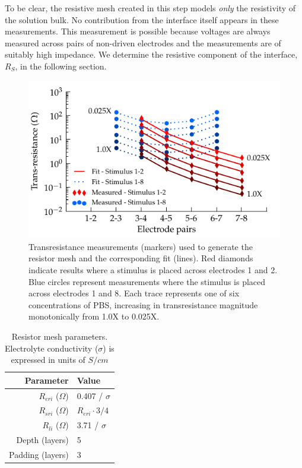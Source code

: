 \documentclass[journal, a4paper]{IEEEtran}
\begin{document}
{
    \color{blue}
    To be clear, the resistive mesh created in this step models \textit{only} the resistivity of the solution bulk. No contribution from the interface itself appears in these measurements. {\color{blue} This measurement is possible} because voltages are always measured across pairs of non-driven electrodes and the measurements are of suitably high impedance. We determine the resistive component of the interface, $R_{S}$, in the {\color{blue} following} section.
}

\begin{figure}
    \begin{center}
        \includegraphics{graphics/pbs_transimpedance_IEEE}
    \end{center}
    \caption{Transresistance measurements (markers) used to generate the resistor mesh and the corresponding fit (lines). Red diamonds indicate results where a stimulus is placed across electrodes 1 and 2. Blue circles represent measurements where the stimulus is placed across electrodes 1 and 8. Each trace represents one of six concentrations of PBS, increasing in transresistance magnitude monotonically from 1.0X to 0.025X.}
    \label{fig:transresistance}
\end{figure}


\begin{table}
    \caption{Resistor mesh parameters. Electrolyte conductivity ($\sigma$) is expressed in units of $S / cm$}
    \label{tab:RESparams}
    \begin{center}
        \begin{tabular}{r | l}
            Parameter & Value \\
            \hline
            $R_{eri}$ ($\Omega$)& 0.407 / $\sigma$\\
            $R_{sri}$ ($\Omega$)& $R_{eri}\cdot 3/4$\\
            $R_{li}$ ($\Omega$)& 3.71 / $\sigma$ \\
            Depth (layers) & 5 \\
            Padding (layers) & 3 \\
        \end{tabular}
    \end{center}
\end{table}
\end{document}
